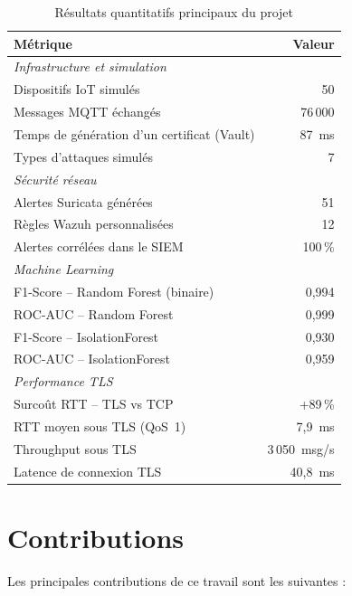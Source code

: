 \begin{table}[H]
\centering
\caption{Résultats quantitatifs principaux du projet}
\label{tab:key_results}
\begin{tabular}{lr}
\toprule
\textbf{Métrique} & \textbf{Valeur} \\
\midrule
\multicolumn{2}{l}{\textit{Infrastructure et simulation}} \\
Dispositifs IoT simulés & 50 \\
Messages MQTT échangés & 76\,000 \\
Temps de génération d'un certificat (Vault) & 87~ms \\
Types d'attaques simulés & 7 \\
\midrule
\multicolumn{2}{l}{\textit{Sécurité réseau}} \\
Alertes Suricata générées & 51 \\
Règles Wazuh personnalisées & 12 \\
Alertes corrélées dans le SIEM & 100\,\% \\
\midrule
\multicolumn{2}{l}{\textit{Machine Learning}} \\
F1-Score -- Random Forest (binaire) & 0,994 \\
ROC-AUC -- Random Forest & 0,999 \\
F1-Score -- IsolationForest & 0,930 \\
ROC-AUC -- IsolationForest & 0,959 \\
\midrule
\multicolumn{2}{l}{\textit{Performance TLS}} \\
Surcoût RTT -- TLS vs TCP & +89\,\% \\
RTT moyen sous TLS (QoS~1) & 7,9~ms \\
Throughput sous TLS & 3\,050~msg/s \\
Latence de connexion TLS & 40,8~ms \\
\bottomrule
\end{tabular}
\end{table}

\section*{Contributions}

Les principales contributions de ce travail sont les suivantes :

